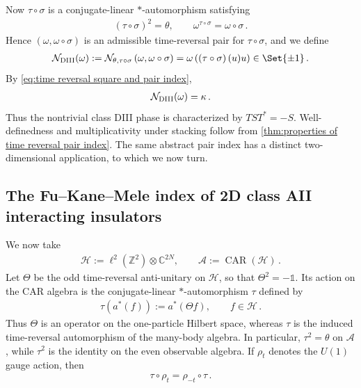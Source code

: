 \documentclass[a4paper,10pt]{article}
\numberwithin{equation}{section}
\theoremstyle{plain}
\theoremstyle{plain}
\theoremstyle{plain}
\theoremstyle{plain}
\theoremstyle{plain}
\theoremstyle{remark}
\theoremstyle{definition}
\newcommand{\ZZ}{\mathbb{Z}}
\newcommand{\CC}{\mathbb{C}}
\newcommand{\calA}{\mathcal{A}}
\newcommand{\calN}{\mathcal{N}}
\newcommand{\calH}{\mathcal{H}}
\newcommand{\Id}{\mathds{1}}
\newcommand{\eq}[1]{\begin{align*}#1\end{align*}}
\newcommand{\eql}[1]{\begin{align}#1\end{align}}
\newcommand{\br}[1]{\left(#1\right)}
\begin{document}
Now $\tau\circ\sigma$ is a conjugate-linear $*$-automorphism satisfying
\eq{
    \br{\tau\circ\sigma}^2
    =
    \theta,
    \qquad
    \omega^{\tau\circ\sigma}
    =
    \omega\circ\sigma\,.
}
Hence $(\omega,\omega\circ\sigma)$ is an admissible time-reversal pair
for $\tau\circ\sigma$, and we define
\eql{
    \calN_{\rm DIII}(\omega)
    :=
    \calN_{\theta,\tau\circ\sigma}
    \br{\omega,\omega\circ\sigma}
    =
    \omega\br{
        \br{\tau\circ\sigma}(u)u
    }
    \in
    \Set{\pm1}
    \label{eq:class DIII index}\,.
}
By \cref{eq:time reversal square and pair index},
\eq{
    \calN_{\rm DIII}(\omega)
    =
    \kappa\,.
}
Thus the nontrivial class DIII phase is characterized by
$TST^*=-S$. Well-definedness and multiplicativity under stacking
follow from
\cref{thm:properties of time reversal pair index}. The same abstract
pair index has a distinct two-dimensional application, to which we
now turn.

\subsection{The Fu--Kane--Mele index of 2D class AII interacting insulators}
\label{sec:Fu Kane Mele pair index}

We now take
\eql{
    \calH
    :=
    \ell^2(\ZZ^2)\otimes\CC^{2N},
    \qquad
    \calA
    :=
    \operatorname{CAR}(\calH)
    \label{eq:FKM CAR algebra}\,.
}
Let $\Theta$ be the odd time-reversal anti-unitary on $\calH$, so that
$\Theta^2=-\Id$. Its action on the CAR algebra is the conjugate-linear
$*$-automorphism $\tau$ defined by
\eql{
    \tau\br{a^*(f)}
    :=
    a^*(\Theta f),
    \qquad f\in\calH
    \label{eq:physical time reversal CAR automorphism}\,.
}
Thus $\Theta$ is an operator on the one-particle Hilbert space, whereas
$\tau$ is the induced time-reversal automorphism of the many-body
algebra. In particular, $\tau^2=\theta$ on $\calA$, while $\tau^2$ is
the identity on the even observable algebra. If $\rho_t$ denotes the
$U(1)$ gauge action, then
\eq{
    \tau\circ\rho_t
    =
    \rho_{-t}\circ\tau\,.
}
\end{document}
